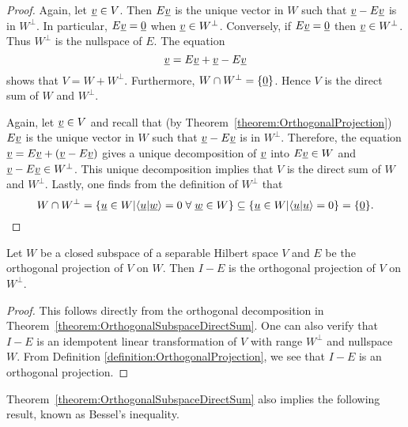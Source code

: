 \begin{proof}
Again, let $\underline{v} \in V$.
Then $E \underline{v}$ is the unique vector in $W$ such that $\underline{v} - E \underline{v}$ is in $W^{\bot}$.
In particular, $E \underline{v} = \underline{0}$ when $\underline{v} \in W^{\bot}$.
Conversely, if $E \underline{v} = \underline{0}$ then $\underline{v} \in W^{\bot}$.
Thus $W^{\bot}$ is the nullspace of $E$.
The equation
\begin{equation*}
\underline{v} = E \underline{v} + \underline{v} - E \underline{v}
\end{equation*}
shows that $V = W + W^{\bot}$.
Furthermore, $W \cap W^{\bot} = \left\{ \underline{0} \right\}$.
Hence $V$ is the direct sum of $W$ and $W^{\bot}$.
\fi

Again, let $\underline{v} \in V$ and recall that (by Theorem~\ref{theorem:OrthogonalProjection}) $E \underline{v}$ is the unique vector in $W$ such that $\underline{v} - E \underline{v}$ is in $W^{\bot}$.
Therefore, the equation $\underline{v} = E \underline{v} + \left( \underline{v} - E \underline{v} \right)$ gives a unique decomposition of $\underline{v}$ into $E \underline{v} \in W$ and $\underline{v} - E \underline{v} \in W^{\bot}$.
This unique decomposition implies that $V$ is the direct sum of $W$ and $W^{\bot}$.
Lastly, one finds from the definition of $W^{\bot}$ that
\[W \cap W^{\bot} = \left\{ \underline{u} \in W | \langle \underline{u} | \underline{w} \rangle =0 \; \forall \; \underline{w}\in W \right\}  \subseteq \left\{ \underline{u} \in W | \langle \underline{u} | \underline{u} \rangle =0 \right\}  = \{ \underline{0} \} .\]
\end{proof}

\begin{corollary}
Let $W$ be a closed subspace of a separable Hilbert space $V$ and $E$ be the orthogonal projection of $V$ on $W$.
Then $I - E$ is the orthogonal projection of $V$ on $W^{\bot}$.
\end{corollary}
\begin{proof}
This follows directly from the orthogonal decomposition in Theorem~\ref{theorem:OrthogonalSubspaceDirectSum}.
One can also verify that $I-E$ is an idempotent linear transformation of $V$ with range $W^{\bot}$ and nullspace $W$.
From Definition \ref{definition:OrthogonalProjection}, we see that $I-E$ is an orthogonal projection.
\end{proof}

Theorem~\ref{theorem:OrthogonalSubspaceDirectSum} also implies the following result, known as Bessel's inequality.

